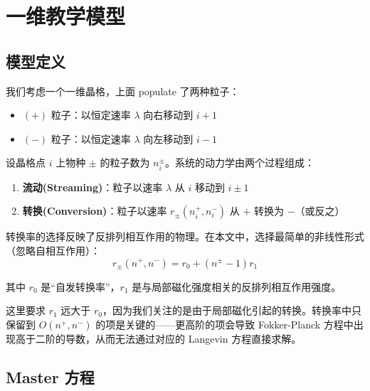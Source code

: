 
\section{一维教学模型}\label{sec:1d-model}

\subsection{模型定义}\label{subsec:model-def}

我们考虑一个一维晶格，上面 populate 了两种粒子：
\begin{itemize}
    \item $(+)$ 粒子：以恒定速率 $\lambda$ 向右移动到 $i+1$
    \item $(-)$ 粒子：以恒定速率 $\lambda$ 向左移动到 $i-1$
\end{itemize}

设晶格点 $i$ 上物种 $\pm$ 的粒子数为 $n_i^\pm$。系统的动力学由两个过程组成：

\begin{keybox}[模型动力学]
\begin{enumerate}
    \item \textbf{流动(Streaming)}：粒子以速率 $\lambda$ 从 $i$ 移动到 $i\pm 1$
    \item \textbf{转换(Conversion)}：粒子以速率 $r_\pm(n_i^+, n_i^-)$ 从 $+$ 转换为 $-$（或反之）
\end{enumerate}
\end{keybox}

转换率的选择反映了反排列相互作用的物理。在本文中，选择最简单的非线性形式（忽略自相互作用）：
\begin{equation}\label{eq:conversion-rate}
\boxed{r_\pm(n^+, n^-) = r_0 + (n^\pm - 1)r_1}
\end{equation}

其中 $r_0$ 是``自发转换率''，$r_1$ 是与局部磁化强度相关的反排列相互作用强度。

\begin{remark}[关于转换率形式的注释]
这里要求 $r_1$ 远大于 $r_0$，因为我们关注的是由于局部磁化引起的转换。转换率中只保留到 $O(n^+, n^-)$ 的项是关键的——更高阶的项会导致 Fokker-Planck 方程中出现高于二阶的导数，从而无法通过对应的 Langevin 方程直接求解。
\end{remark}

\subsection{Master 方程}\label{subsec:master-eq}

